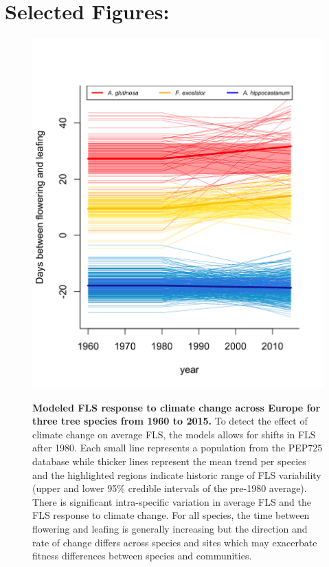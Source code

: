 \documentclass[10.5pt,a4paper]{article}
\begin{document}
\section*{Selected Figures:}
   \begin{figure}[ht!]
   \centering
 \includegraphics[width=.6\textwidth]{..//figure/FLS_climate_change.png}\\
\caption{\textbf{Modeled FLS response to climate change across Europe for three tree species from 1960 to 2015.} To detect the effect of climate change on average FLS, the models allows for shifts in FLS after 1980. Each small line represents a population from the PEP725 database while thicker lines represent the mean trend per species and the highlighted regions indicate historic range of FLS variability (upper and lower 95\% credible intervals of the pre-1980 average). There is significant intra-specific variation in average FLS and the FLS response to climate change. For all species, the time between flowering and leafing is generally increasing but the direction and rate of change differs across species and sites which may exacerbate fitness differences between species and communities.}
    \label{fig:Figure 1}
    \end{figure}
\newpage

\end{document}
